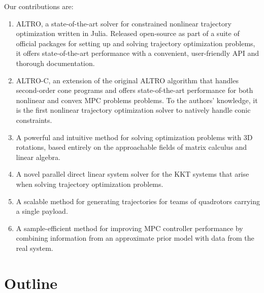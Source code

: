 \documentclass[../root.tex]{subfiles}
\begin{document}
Our contributions are:
\begin{enumerate}
    \item ALTRO, a state-of-the-art solver for constrained nonlinear trajectory 
    optimization written in Julia. Released open-source as part of a suite of 
    official packages for setting up and solving trajectory optimization problems,
    it offers state-of-the-art performance with a convenient, user-friendly API 
    and thorough documentation.
    \item ALTRO-C, an extension of the original ALTRO algorithm that handles
    second-order cone programs and offers state-of-the-art performance for
    both nonlinear and convex MPC problems problems. To the authors'
    knowledge, it is the first nonlinear trajectory optimization solver to
    natively handle conic constraints.
    \item A powerful and intuitive method for solving optimization problems with 
    3D rotations, based entirely on the approachable fields of matrix calculus
    and linear algebra.
    \item A novel parallel direct linear system solver for the KKT systems that 
    arise when solving trajectory optimization problems. 
    \item A scalable method for generating trajectories for teams of quadrotors
    carrying a single payload.
    \item A sample-efficient method for improving MPC controller performance by 
    combining information from an approximate prior model with data from the real 
    system.
\end{enumerate}

\section{Outline}
\end{document}
